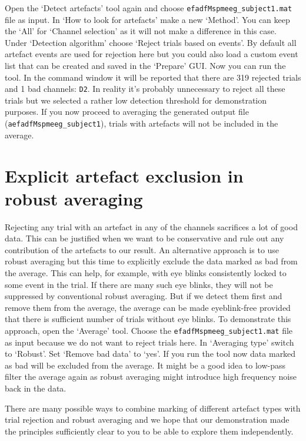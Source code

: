 Open the `Detect artefacts' tool again and choose \texttt{efadfMspmeeg\_subject1.mat} file as input. In `How to look for artefacts' make a new `Method'. You can keep the `All' for `Channel selection' as it will not make a difference in this case. Under `Detection algorithm' choose `Reject trials based on events'. By default all artefact events are used for rejection here but you could also load a custom event list that can be created and saved in the `Prepare' GUI. Now you can run the tool. In the command window it will be reported that there are 319 rejected trials and 1 bad channels: \texttt{D2}. In reality it's probably unnecessary to reject all these trials but we selected a rather low detection threshold for demonstration purposes. If you now proceed to averaging the generated output file (\texttt{aefadfMspmeeg\_subject1}), trials with artefacts will not be included in the average. 

\section{Explicit artefact exclusion in robust averaging}

Rejecting any trial with an artefact in any of the channels sacrifices a lot of good data.  This can be justified when we want to be conservative and rule out any contribution of the artefacts to our result. An alternative approach is to use robust averaging but this time to explicitly exclude the data marked as bad from the average. This can help, for example, with eye blinks consistently locked to some event in the trial. If there are many such eye blinks, they will not be suppressed by conventional robust averaging. But if we detect them first and remove them from the average, the average can be made eyeblink-free provided that there is sufficient number of trials without eye blinks. To demonstrate this approach, open the `Average' tool. Choose the \texttt{efadfMspmeeg\_subject1.mat} file as input because we do not want to reject trials here. In `Averaging type' switch to `Robust'.  Set `Remove bad data' to `yes'. If you run the tool now data marked as bad will be excluded from the average. It might be a good idea to low-pass filter the average again as robust averaging might introduce high frequency noise back in the data. 

There are many possible ways to combine marking of different artefact types with trial rejection and robust averaging and we hope that our demonstration made the principles sufficiently clear to you to be able to explore them independently. 



